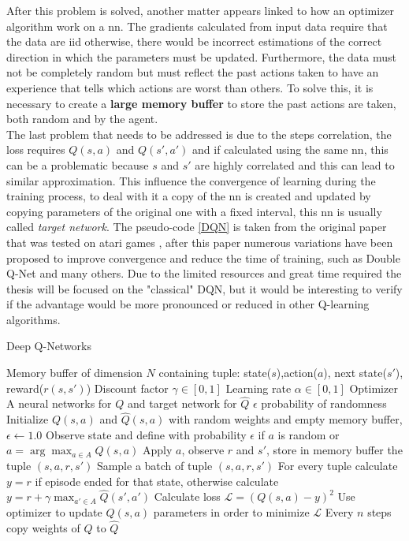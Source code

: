 After this problem is solved, another matter appears linked to how an optimizer algorithm work on a \acrshort{nn}. The gradients calculated from input data require that the data are \acrshort{iid} otherwise, there would be incorrect estimations of the correct direction in which the parameters must be updated. Furthermore, the data must not be completely random but must reflect the past actions taken to have an experience that tells which actions are worst than others. To solve this, it is necessary to create a \textbf{large memory buffer} to store the past actions are taken, both random and by the agent.\\
The last problem that needs to be addressed is due to the steps correlation, the loss requires $Q(s, a)$ and $Q(s', a')$ and if calculated using the same \acrshort{nn}, this can be a problematic because $s$ and $s'$ are highly correlated and this can lead to similar approximation. This influence the convergence of learning during the training process, to deal with it a copy of the \acrshort{nn} is created and updated by copying parameters of the original one with a fixed interval, this \acrshort{nn} is usually called \textit{target network}.
The pseudo-code \ref{DQN} is taken from the original paper that was tested on atari games \cite{DBLP:journals/corr/MnihKSGAWR13}, after this paper numerous variations have been proposed to improve convergence and reduce the time of training, such as Double Q-Net \cite{DBLP:journals/corr/HasseltGS15} and many others. Due to the limited resources and great time required the thesis will be focused on the "classical" DQN, but it would be interesting to verify if the advantage would be more pronounced or reduced in other Q-learning algorithms.
\begin{algorithm} \label{DQN}
	\caption{Deep Q-Networks}
	\begin{algorithmic}
		\REQUIRE Memory buffer of dimension $N$ containing tuple: state($s$),action($a$), next state($s'$), reward($r(s,s')$)
		\REQUIRE Discount factor $\gamma \in [0,1]$
		\REQUIRE Learning rate  $\alpha \in  [0,1]$
		\REQUIRE Optimizer
		\REQUIRE A neural networks for $Q$ and target network for $\hat{Q}$
		\REQUIRE $\epsilon$ probability of randomness
		\STATE Initialize $Q(s,a)$ and $\hat{Q}(s,a)$ with random weights and empty memory buffer, $\epsilon \leftarrow 1.0$
		\STATE Observe state and define with probability $\epsilon$ if $a$ is random or $a = \arg \max_{a \in A} Q(s,a)$
		\STATE Apply $a$, observe $r$ and $s'$, store in memory buffer the tuple $(s,a,r,s')$
		\STATE Sample a batch of tuple $(s,a,r,s')$
		\STATE For every tuple calculate $y = r$ if episode ended for that state, otherwise calculate $y = r + \gamma \max_{a' \in A} \hat{Q}(s',a')$
		\STATE Calculate loss $\mathcal{L} = (Q(s,a) - y)^2$
		\STATE Use optimizer to update $Q(s,a)$ parameters in order to minimize $\mathcal{L}$ 
		\STATE Every $n$ steps copy weights of $Q$ to $\hat{Q}$
		\ENDWHILE		
	\end{algorithmic}
\end{algorithm}\\
